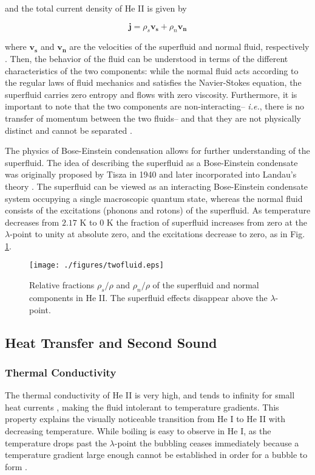 and the total current density of He II is given by

\begin{equation}
\mathbf{j} = \rho_s\mathbf{v_s} + \rho_n\mathbf{v_n}
\end{equation}

where $\mathbf{v_s}$ and $\mathbf{v_n}$ are the velocities of the
superfluid and normal fluid, respectively \cite{tilley}. Then, the
behavior of the fluid can be understood in terms of the different
characteristics of the two components: while the normal fluid acts
according to the regular laws of fluid mechanics and satisfies the
Navier-Stokes equation, the superfluid carries zero entropy and flows
with zero viscosity. Furthermore, it is important to note that the two
components are non-interacting-- \emph{i.e.}, there is no transfer of
momentum between the two fluids-- and that they are
not physically distinct and cannot be separated \cite{tilley}.

The physics of Bose-Einstein condensation allows for further
understanding of the superfluid. The idea of describing the superfluid
as a Bose-Einstein condensate was originally proposed by Tisza in 1940
and later incorporated into Landau's theory \cite{tisza}. The
superfluid can be viewed as an interacting Bose-Einstein condensate
system occupying a single macroscopic quantum state, whereas the
normal fluid consists of the excitations (phonons and rotons) of the
superfluid. As temperature decreases from $2.17$ K to $0$ K the fraction
of superfluid increases from zero at the $\lambda$-point to unity at
absolute zero, and the excitations decrease to zero, as in Fig.
\ref{fig:twofluid}\cite{andro}.

\begin{figure}[ht]
\begin{center}
\texttt{[image: ./figures/twofluid.eps]}
\caption{\small{Relative fractions $\rho_s/\rho$ and $\rho_n/\rho$ of
    the superfluid and normal components in He II\cite{andro}. The
    superfluid effects disappear above the $\lambda$-point.}}
\label{fig:twofluid}
\end{center}
\end{figure}


\subsection{Heat Transfer and Second Sound}\label{heattransferandsecondsound}

\subsubsection{Thermal Conductivity}\label{thermalconductivity}
The thermal conductivity of He II is very high, and tends to infinity
for small heat currents \cite{tilley}, making the fluid intolerant
to temperature gradients. This property explains the visually
noticeable transition from He I to He II with decreasing temperature.
While boiling is easy to observe in He I, as the temperature drops
past the $\lambda$-point the bubbling ceases immediately because a
temperature gradient large enough cannot be established in order for a
bubble to form \cite{tilley}.


